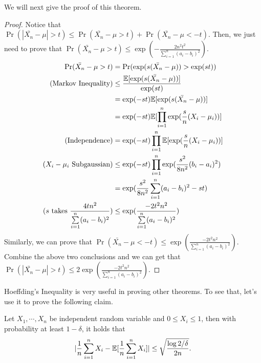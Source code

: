 \documentclass[../main.tex]{subfiles}
\begin{document}
We will next give the proof of this theorem.

\begin{proof}
	Notice that $\Pr(|\bar{X_n} - \mu| > t) \leq  \Pr(\bar{X_n} - \mu > t) + \Pr(\bar{X_n} - \mu < -t)$. Then, we just need to prove that $\Pr(\bar{X_n} - \mu > t) \leq \exp(-\frac{2n^2t^2}{\sum\limits_{i=1}^n (a_i - b_i)^2})$.
	\begin{equation*}
		\begin{aligned}		
			\Pr(\bar{X_n} - \mu > t) & = \Pr(\exp(s(\bar{X_n} - \mu)) > \exp(st)) \\
									(\textmd{Markov Inequality}) & \leq \frac{\EE[\exp(s(\bar{X_n} - \mu))]}{\exp(st)} \\
																& = \exp(-st)  \EE[\exp(s(\bar{X_n} - \mu))]\\
																& = \exp(-st)  \EE[\prod_{i=1}^n \exp(\frac{s}{n} (X_i - \mu_i))] \\
															(\textmd{Independence})	& = \exp(-st) \prod_{i=1}^n \EE[ \exp(\frac{s}{n} (X_i - \mu_i))] \\
														(X_i - \mu_i\ \textmd{Subgaussian})	& \leq  \exp(-st) \prod_{i=1}^n \exp(\frac{s^2}{8n^2} (b_i - a_i)^2) \\
														& = \exp(\frac{s^2}{8n^2} \sum\limits_{i=1}^n (a_i - b_i)^2 - st ) \\
												(s\ \textmd{takes}\ \frac{4tn^2}{\sum\limits_{i=1}^n (a_i - b_i)^2})& \leq \exp(\frac{-2t^2n^2}{\sum\limits_{i=1}^n (a_i - b_i)^2}) 
		\end{aligned}
	\end{equation*}
	Similarly, we can prove that $\Pr(\bar{X_n} - \mu < -t) \leq \exp(\frac{-2t^2n^2}{\sum\limits_{i=1}^n (a_i - b_i)^2}) $. Combine the above two conclusions and we can get that $\Pr(|\bar{X_n} - \mu| > t) \leq 2 \exp(\frac{-2t^2n^2}{\sum\limits_{i=1}^n (a_i - b_i)^2})$.
\end{proof}

Hoeffding's Inequality is very useful in proving other theorems. To see that, let's use it to prove the following claim.

\begin{claim}
	Let $X_1, \cdots, X_n$ be independent random variable and $0 \leq X_i \leq 1$, then with probability at least $1-\delta$, it holds that 
	\begin{equation}
		|\frac{1}{n} \sum\limits_{i=1}^n X_i - \mathbb{E}[\frac{1}{n} \sum\limits_{i = 1}^n X_i]| \leq \sqrt{\frac{\log 2/\delta}{2n}}.
	\end{equation}
\end{claim}
\end{document}
